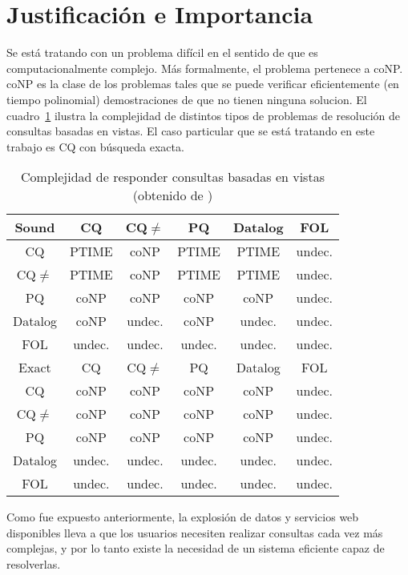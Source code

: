 \section{Justificación e Importancia}

Se está tratando con un problema difícil \cite{lenzerini:dataintegration} en el
sentido de que es computacionalmente complejo. Más formalmente, el problema
pertenece a coNP.
coNP es la clase de los problemas tales que se puede verificar eficientemente (en
tiempo polinomial) demostraciones de que no tienen ninguna solucion.
El cuadro~\ref{cqcomplexity}
ilustra la complejidad de distintos tipos de
problemas de resolución de consultas basadas en vistas. El caso particular que
se está tratando en este trabajo es CQ con búsqueda exacta.

\begin{table}
\begin{center}
  \begin{tabular}{|c||c|c|c|c|c|}
\hline
Sound  &  CQ  & CQ$\neq$  & PQ  &Datalog &FOL \\
\hline
  CQ  & PTIME &coNP  &PTIME &PTIME  &undec. \\
 CQ$\neq$  & PTIME &coNP  &PTIME &PTIME  &undec. \\
  PQ  &  coNP &coNP  & coNP & coNP  &undec. \\
Datalog &coNP &undec.& coNP &undec. &undec. \\
 FOL  & undec.&undec.&undec.&undec. &undec. \\
\hline
 Exact  & CQ &  CQ$\neq$     &  PQ  &Datalog &FOL \\
\hline
  CQ    &coNP &coNP  & coNP & coNP  &undec. \\
 CQ$\neq$    &coNP &coNP  & coNP & coNP  &undec. \\
  PQ    &coNP &coNP  & coNP & coNP  &undec. \\
Datalog&undec.&undec.&undec.&undec. &undec. \\
 FOL   &undec.&undec.&undec.&undec. &undec. \\
\hline
  \end{tabular}
  \caption{Complejidad de responder consultas basadas en vistas (obtenido de
\cite{lenzerini:dataintegration})}
  \label{cqcomplexity}
\end{center}
\end{table}

Como fue expuesto anteriormente, la explosión de datos y servicios web
disponibles lleva a que los usuarios necesiten realizar consultas cada vez más
complejas, y por lo tanto existe la necesidad de un sistema eficiente capaz de
resolverlas.

